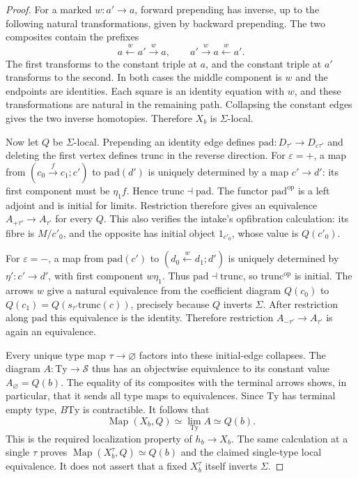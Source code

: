 \begin{proof}
For a marked $w:a'\to a$, forward prepending has inverse, up to
the following natural transformations, given by backward prepending.
The two composites contain the prefixes
\[
 a\xleftarrow{w}a'\xrightarrow{w}a,
 \qquad
 a'\xrightarrow{w}a\xleftarrow{w}a'.
\]
The first transforms to the constant triple at $a$, and the constant
triple at $a'$ transforms to the second. In both cases the middle
component is $w$ and the endpoints are identities. Each square is
an identity equation with $w$, and these transformations are
natural in the remaining path. Collapsing the constant edges gives
the two inverse homotopies. Therefore $X_b$ is $\Sigma$-local.

Now let $Q$ be $\Sigma$-local. Prepending an identity edge defines
$\mathrm{pad}:D_{\tau'}\to D_{\varepsilon\tau'}$ and deleting
the first vertex defines $\mathrm{trunc}$ in the reverse direction.
For $\varepsilon=+$, a map from
$(c_0\xrightarrow{f}c_1;c')$ to $\mathrm{pad}(d')$ is uniquely
determined by a map $c'\to d'$: its first component must be
$\eta_1 f$. Hence $\mathrm{trunc}\dashv\mathrm{pad}$.
The functor $\mathrm{pad}^{\mathrm{op}}$ is a left adjoint and
is initial for limits. Restriction therefore gives an equivalence
$A_{+\tau'}\to A_{\tau'}$ for every $Q$. This also verifies the
intake's opfibration calculation: its fibre is $M/c'_0$, and the
opposite has initial object $1_{c'_0}$, whose value is $Q(c'_0)$.

For $\varepsilon=-$, a map from $\mathrm{pad}(c')$ to
$(d_0\xleftarrow{w}d_1;d')$ is uniquely determined by
$\eta':c'\to d'$, with first component $w\eta_1$.
Thus $\mathrm{pad}\dashv\mathrm{trunc}$, so
$\mathrm{trunc}^{\mathrm{op}}$ is initial. The arrows $w$ give
a natural equivalence from the coefficient diagram $Q(c_0)$ to
$Q(c_1)=Q(s_{\tau'}\mathrm{trunc}(c))$, precisely because $Q$
inverts $\Sigma$. After restriction along $\mathrm{pad}$ this
equivalence is the identity. Therefore restriction
$A_{-\tau'}\to A_{\tau'}$ is again an equivalence.

Every unique type map $\tau\to\varnothing$ factors into these
initial-edge collapses. The diagram $A:\mathrm{Ty}\to\mathcal S$
thus has an objectwise equivalence to its constant value
$A_\varnothing=Q(b)$. The equality of its composites with the
terminal arrows shows, in particular, that it sends all type maps
to equivalences. Since $\mathrm{Ty}$ has terminal empty type,
$B\mathrm{Ty}$ is contractible. It follows that
\[
 \operatorname{Map}(X_b,Q)
 \simeq\lim_{\mathrm{Ty}}A\simeq Q(b).
\]
This is the required localization property of $h_b\to X_b$.
The same calculation at a single $\tau$ proves
$\operatorname{Map}(X_b^\tau,Q)\simeq Q(b)$ and the claimed
single-type local equivalence. It does not assert that a fixed
$X_b^\tau$ itself inverts $\Sigma$.
\end{proof}

